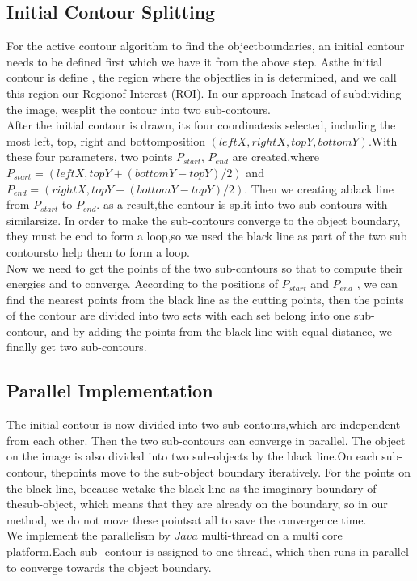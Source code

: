 \subsection{Initial Contour Splitting}\label{subsec:initial-contour-splitting}
For the active contour algorithm to find the objectboundaries, an initial contour
needs to be defined first which we have it from the above step. Asthe initial contour
is define , the region where the objectlies in is determined, and we call this region
our Regionof Interest (ROI). In our approach Instead of subdividing the image, wesplit
the contour into two sub-contours.\\
After the initial contour is drawn, its four coordinatesis selected, including the
most left, top, right and bottomposition $(leftX, rightX,topY,bottomY)$.With these four
parameters, two points $P_{start}$, $P_{end}$ are created,where $P_{start} = (leftX , topY + (bottomY -
topY )/2)$ and $P_{end} = (rightX, topY + (bottomY - topY )/2)$.
Then we creating ablack line from $P_{start}$ to $P_{end}$.
as a result,the contour is split into two sub-contours with similarsize.
In order to make the sub-contours converge to the object boundary, they
must be end to form a loop,so we used the black line as part of the two sub
contoursto help them to form a loop.\\
Now we need to get the points of the two sub-contours so that to compute their
energies and to converge. According to the positions of $P_{start}$ and $P_{end}$ , we can find the
nearest points from the black line as the cutting points, then the points of the contour
are divided into two sets with each set belong into one sub-contour, and by adding
the points from the black line with equal distance, we finally get two sub-contours.

\subsection{Parallel Implementation}\label{subsec:parallel-implementation}
The initial contour is now divided into two sub-contours,which are independent from
each other. Then the two sub-contours can converge in parallel. The object on the
image is also divided into two sub-objects by the black line.On each sub-contour,
thepoints move to the sub-object boundary iteratively. For the points on the black
line, because wetake the black line as the imaginary boundary of thesub-object,
which means that they are already on the boundary, so in our method, we do not
move these pointsat all to save the convergence time.\\
We implement the parallelism by $Java$ multi-thread on a multi core platform.Each sub-
contour is assigned to one thread, which then runs in parallel to converge towards the
object boundary.
